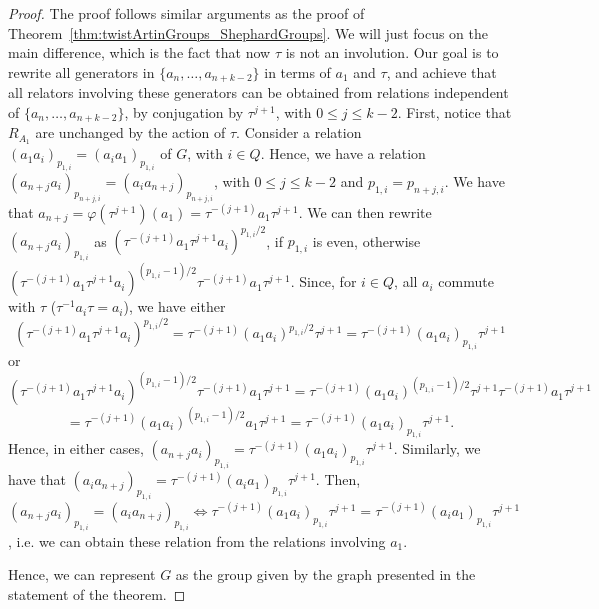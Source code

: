 \documentclass[11pt,letterpaper]{amsart}
\begin{document}
\begin{proof}
    The proof follows similar arguments as the proof of Theorem~\ref{thm:twistArtinGroups_ShephardGroups}. We will just focus on the main difference, which is the fact that now $\tau$ is not an involution. Our goal is to rewrite all generators in $\{a_n,\ldots,a_{n+k-2}\}$ in terms of $a_1$ and $\tau$, and achieve that all relators involving these generators can be obtained from relations independent of $\{a_n,\ldots,a_{n+k-2}\}$, by conjugation by $\tau^{j+1}$, with $0\leq j\leq k-2$.
    First, notice that $R_{A_1}$ are unchanged by the action of $\tau$. Consider a relation $(a_1a_i)_{p_{1,i}}=(a_ia_1)_{p_{1,i}}$ of $G$, with $i\in Q$. Hence, we have a relation $(a_{n+j}a_i)_{p_{n+j,i}}=(a_ia_{n+j})_{p_{n+j,i}}$, with $0\leq j\leq k-2$ and $p_{1,i}=p_{n+j,i}$. We have that $a_{n+j}=\varphi(\tau^{j+1})(a_1)=\tau^{-(j+1)}a_1\tau^{j+1}$.
    We can then rewrite $(a_{n+j}a_i)_{p_{1,i}}$ as $(\tau^{-(j+1)}a_1\tau^{j+1}a_i)^{p_{1,i}/2} $, if $p_{1,i}$ is even, otherwise $(\tau^{-(j+1)}a_1\tau^{j+1}a_i)^{(p_{1,i}-1)/2}\tau^{-(j+1)}a_1\tau^{j+1}$.
    Since, for $i\in Q$, all $a_i$ commute with $\tau$ ($\tau^{-1}a_i\tau = a_i$), we have either 
    $$(\tau^{-(j+1)}a_1\tau^{j+1}a_i)^{p_{1,i}/2} =\tau^{-(j+1)}(a_1a_i)^{p_{1,i}/2} \tau^{j+1}=\tau^{-(j+1)}(a_1a_i)_{p_{1,i}} \tau^{j+1}$$
    or
    $$(\tau^{-(j+1)}a_1\tau^{j+1}a_i)^{(p_{1,i}-1)/2}\tau^{-(j+1)}a_1\tau^{j+1}= \tau^{-(j+1)}(a_1a_i)^{(p_{1,i}-1)/2}\tau^{j+1}\tau^{-(j+1)}a_1\tau^{j+1}$$ $$=\tau^{-(j+1)}(a_1a_i)^{(p_{1,i}-1)/2}a_1\tau^{j+1} = \tau^{-(j+1)}(a_1a_i)_{p_{1,i}} \tau^{j+1}.$$
    Hence, in either cases, $(a_{n+j}a_i)_{p_{1,i}}=\tau^{-(j+1)}(a_1a_i)_{p_{1,i}} \tau^{j+1}$. Similarly, we have that $(a_ia_{n+j})_{p_{1,i}}=\tau^{-(j+1)}(a_ia_1)_{p_{1,i}} \tau^{j+1}$. Then, $(a_{n+j}a_{i})_{p_{1,i}}=(a_ia_{n+j})_{p_{1,i}}\Leftrightarrow\tau^{-(j+1)}(a_1a_i)_{p_{1,i}} \tau^{j+1}=\tau^{-(j+1)}(a_ia_1)_{p_{1,i}} \tau^{j+1}$, i.e. we can obtain these relation from the relations involving $a_1$.
    
    Hence, we can represent $G$ as the group given by the graph presented in the statement of the theorem.
\end{proof}
\end{document}
